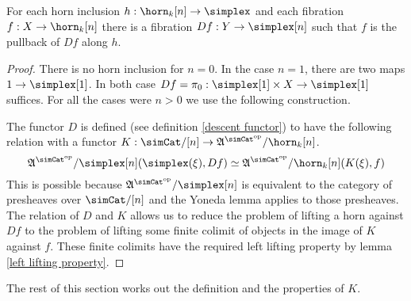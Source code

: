 \documentclass[csh.tex]{subfiles}
\begin{document}
\begin{lemma}[Descent]
For each horn inclusion $h\of \horn_k[n]\to\simplex$ and each fibration $f\of X\to \horn_k[n]$ there is a fibration $Df\of Y\to\simplex[n]$ such that $f$ is the pullback of $Df$ along $h$.
\label{descent}
\end{lemma}

\begin{proof} There is no horn inclusion for $n=0$. In the case $n=1$, there are two maps $1\to\simplex[1]$. In both case $Df=\pi_0\of \simplex[1]\times X \to\simplex[1]$ suffices. For all the cases were $n>0$ we use the following construction.

The functor $D$ is defined (see definition \ref{descent functor}) to have the following relation with a functor $K\of\simCat/[n]\to\ambient\s/\horn_k[n]$.
\[ \ambient\s/\simplex[n](\simplex(\xi), Df)\simeq \ambient\s/\horn_k[n](K(\xi), f) \]
This is possible because $\ambient\s/\simplex[n]$ is equivalent to the category of presheaves over $\simCat/[n]$ and the Yoneda lemma applies to those presheaves. %
The relation of $D$ and $K$ allows us to reduce the problem of lifting a horn against $Df$ to the problem of lifting some finite colimit of objects in the image of $K$ against $f$. These finite colimits have the required left lifting property by lemma \ref{left lifting property}.
\end{proof}

The rest of this section works out the definition and the properties of $K$.
\end{document}
